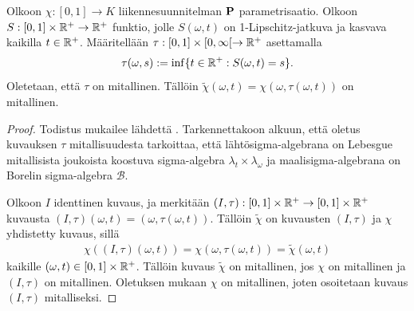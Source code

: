 \documentclass[12pt,oneside,a4paper]{amsbook} %
\begin{document}
\begin{lemma}\label{le:parametrizeLemma}
    Olkoon $\chi : [0, 1] \to K$ liikennesuunnitelman $\P$ parametrisaatio. Olkoon $S:[0,1]\times \Rp \to \Rp$ funktio, jolle $S(\omega, t)$ on 1-Lipschitz-jatkuva ja kasvava kaikilla $t \in \Rp$. Määritellään $\tau:[0, 1] \times [0, \infty [ \to \Rp$ asettamalla
    \begin{equation*}
        \tau(\omega, s) := \inf \{t \in \Rp : S(\omega, t) = s\}.
    \end{equation*}
    Oletetaan, että $\tau$ on mitallinen. Tällöin $\tilde\chi(\omega, t) = \chi(\omega, \tau(\omega, t))$ on mitallinen.
\end{lemma}
\begin{proof}
    Todistus mukailee lähdettä \cite[s. 44]{optimal}. Tarkennettakoon alkuun, että oletus kuvauksen $\tau$ mitallisuudesta tarkoittaa, että lähtösigma-algebrana on Lebesgue mitallisista joukoista koostuva sigma-algebra $\lambda_t \times \lambda_\omega$ ja maalisigma-algebrana on Borelin sigma-algebra $\mathcal{B}$.
    
    Olkoon $I$ identtinen kuvaus, ja merkitään $(I, \tau) : [0, 1] \times \Rp \to [0, 1] \times \Rp $  kuvausta $(I, \tau)(\omega, t) = (\omega, \tau(\omega, t))$. Tällöin $\tilde \chi$ on kuvausten $(I, \tau)$ ja $\chi$ yhdistetty kuvaus, sillä
    \begin{align*}
        \chi((I, \tau)(\omega, t)) = \chi(\omega, \tau(\omega, t)) = \tilde \chi(\omega, t)
    \end{align*}
    kaikille $(\omega, t) \in [0, 1] \times \Rp$. Tällöin kuvaus $\tilde \chi$ on mitallinen, jos $\chi$ on mitallinen ja $(I, \tau)$ on mitallinen. Oletuksen mukaan $\chi$ on mitallinen, joten osoitetaan kuvaus $(I, \tau)$ mitalliseksi.
    

\end{proof}
\end{document}
